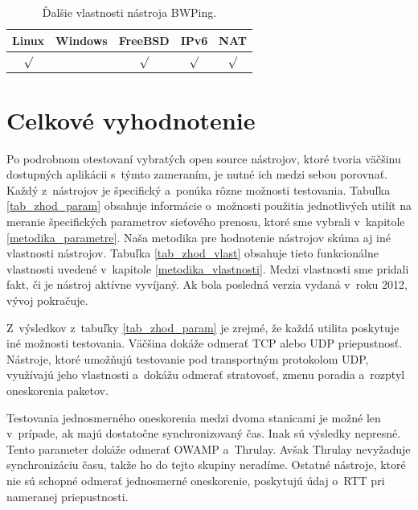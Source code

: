         \begin{table}[H]
            \begin{center}
                \begin{tabular}{|c|c|c|c|c|}
                    \hline
                    \textbf{Linux}  &  \textbf{Windows}  &
                    \textbf{FreeBSD} & \textbf{IPv6} &
                    \textbf{NAT} \\
                    \hline
                    $\surd$ &  & $\surd$ &  $\surd$ & $\surd$ \\ 
                    \hline
                \end{tabular}
                \caption{Ďalšie vlastnosti nástroja BWPing.}
                \label{tab_bwping_vlast}
            \end{center}
        \end{table}

    \section{Celkové vyhodnotenie} \label{nastroje_zhod}
    Po podrobnom otestovaní vybratých open source nástrojov, ktoré tvoria 
    väčšinu dostupných aplikácii s~týmto zameraním, je nutné ich medzi sebou
    porovnať. Každý z~nástrojov je špecifický a~ponúka rôzne možnosti
    testovania. Tabuľka \ref{tab_zhod_param} obsahuje informácie o~možnosti
    použitia jednotlivých utilít na meranie špecifických parametrov sieťového 
    prenosu, ktoré sme vybrali v~kapitole \ref{metodika_parametre}. Naša
    metodika pre hodnotenie nástrojov skúma aj iné vlastnosti nástrojov. 
    Tabuľka \ref{tab_zhod_vlast} obsahuje tieto funkcionálne vlastnosti uvedené v~kapitole 
    \ref{metodika_vlastnosti}. Medzi vlastnosti sme pridali fakt, či je nástroj 
    aktívne vyvíjaný. Ak bola posledná verzia vydaná v~roku 2012, vývoj pokračuje. 

    Z~výsledkov z~tabuľky \ref{tab_zhod_param} je zrejmé, že každá utilita
    poskytuje iné možnosti testovania. Väčšina dokáže odmerať TCP alebo UDP
    priepustnosť. 
    Nástroje, ktoré umožňujú testovanie pod transportným protokolom UDP,
    využívajú jeho vlastnosti a~dokážu odmerať stratovosť, zmenu poradia 
    a~rozptyl oneskorenia paketov.

    Testovania jednosmerného oneskorenia medzi dvoma stanicami je
    možné len v~prípade, ak majú dostatočne synchronizovaný čas. Inak sú
    výsledky nepresné. Tento parameter dokáže odmerať OWAMP a~Thrulay. Avšak
    Thrulay nevyžaduje synchronizáciu času, takže ho do tejto skupiny
    neradíme. Ostatné nástroje, ktoré nie sú schopné odmerať jednosmerné
    oneskorenie, poskytujú údaj o~RTT pri nameranej priepustnosti.
    

